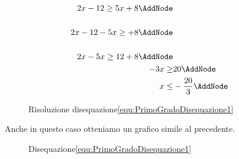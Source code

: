 \begin{figure}
	\begin{NodesList}[margin=4.5cm]
		\centering
		\begin{align*}
		2x-12\geq 5x+8\AddNode\\[.5cm] 
		2x-12-5x\geq+8\AddNode\\[.5cm] %
		2x-5x\geq 12+8\AddNode\\
		-3x\geq &20\AddNode\\
		x\leq&-\dfrac{20}{3}\AddNode
		\end{align*}
	\end{NodesList}
	\captionsetup{format=esempio,list=no}
	\caption{Risoluzione disequazione\nobs\vref{equ:PrimoGradoDisequazione1}}
	\label{fig:esempioDisequazioniPgrado2}
\end{figure}
Anche in questo caso otteniamo un grafico simile al precedente.
\begin{figure}
	\centering
	\captionsetup{format=grafico,list=no}
	\caption[]{Disequazione\nobs\vref{equ:PrimoGradoDisequazione1}}
	\label{fig:esempioDisequazioniPgradografico2}
\end{figure}
